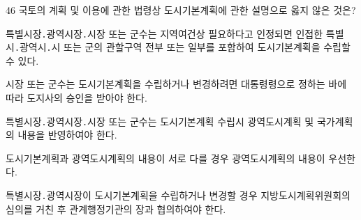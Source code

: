 \begin{question}{46}
국토의 계획 및 이용에 관한 법령상 도시기본계획에 관한 설명으로 옳지 않은 것은?
\begin{choices}
  \item 특별시장․광역시장․시장 또는 군수는 지역여건상 필요하다고 인정되면 인접한 특별시․광역시․시 또는 군의 관할구역 전부 또는 일부를 포함하여 도시기본계획을 수립할 수 있다.
  \item 시장 또는 군수는 도시기본계획을 수립하거나 변경하려면 대통령령으로 정하는 바에 따라 도지사의 승인을 받아야 한다.
  \item 특별시장․광역시장․시장 또는 군수는 도시기본계획 수립시 광역도시계획 및 국가계획의 내용을 반영하여야 한다.
  \item 도시기본계획과 광역도시계획의 내용이 서로 다를 경우 광역도시계획의 내용이 우선한다.
  \item 특별시장․광역시장이 도시기본계획을 수립하거나 변경할 경우 지방도시계획위원회의 심의를 거친 후 관계행정기관의 장과 협의하여야 한다.
\end{choices}
\end{question}
